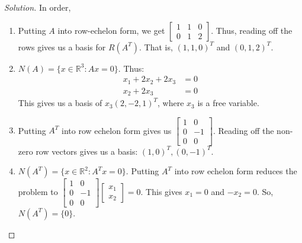 \documentclass[../main.tex]{subfiles}
\begin{document}
\begin{proof}[Solution] In order,
\begin{enumerate}
\item Putting $A$ into row-echelon form, we get $\begin{bmatrix} 1 & 1 & 0 \\ 0 & 1 & 2 \end{bmatrix}$. Thus, reading off the rows gives us a basis for $R(A^T)$. That is, $(1,1,0)^T$ and $(0,1,2)^T$.
\item $N(A) = \{x\in \mathbb{R}^3: Ax = 0\}$. Thus:
\begin{align*}
    x_1 + 2x_2 + 2x_3 &= 0\\
    x_2 + 2x_3 &= 0
\end{align*}
This gives us a basis of $x_3(2,-2,1)^T$, where $x_3$ is a free variable.
\item Putting $A^T$ into row echelon form gives us $\begin{bmatrix} 1 & 0 \\ 0 & -1 \\ 0 & 0 \end{bmatrix}$. Reading off the non-zero row vectors gives us a basis: $(1,0)^T, (0,-1)^T$.
\item $N(A^T)= \{x\in \mathbb{R}^2: A^T x = 0\}$. Putting $A^T$ into row echelon form reduces the problem to $\begin{bmatrix} 1 & 0 \\ 0 & -1 \\ 0 & 0 \end{bmatrix} \begin{bmatrix} x_1 \\ x_2 \end{bmatrix} = 0$. This gives $x_1 = 0$ and $-x_2 = 0$. So, $N(A^T) = \{0\}$.
\end{enumerate}
\end{proof}
%
\end{document}

